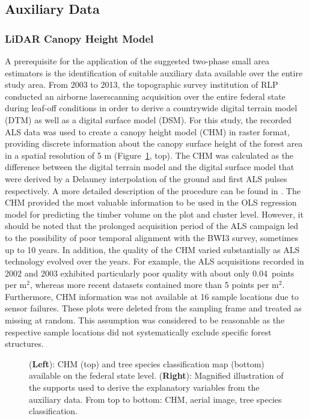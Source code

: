\documentclass[remotesensing,article,accept,moreauthors,pdftex,10pt,a4paper]{Definitions/mdpi}
\begin{document}
\subsection{Auxiliary Data}
\label{sec:auxinfo}
\vspace{-6pt}
\subsubsection{LiDAR Canopy Height Model}
\label{sec:chm}

A prerequisite for the application of the suggested two-phase small area estimators is the identification of suitable auxiliary data available over the entire study area. From 2003 to 2013, the topographic survey institution of RLP conducted an airborne laserscanning acquisition over the entire federal state during leaf-off conditions in order to derive a countrywide digital terrain model (DTM) as well as a digital surface model (DSM). For this study, the recorded ALS data was used to create a canopy height model (CHM) in raster format, providing discrete information about the canopy surface height of the forest area in a spatial resolution of 5 m (Figure~\ref{fig:Auxvars}, {top}). The CHM was calculated as the difference between the digital terrain model and the digital surface model that were derived by a Delauney interpolation of the ground and first ALS pulses respectively. A more detailed description of the procedure can be found in \citet{hill2017a}. The CHM provided the most valuable information to be used in the OLS regression model for predicting the timber volume on the plot and cluster level. However, it should be noted that the prolonged acquisition period of the ALS campaign led to the possibility of poor temporal alignment with the BWI3 survey, sometimes up to 10 years. In addition, the quality of the CHM varied substantially as ALS technology evolved over the years.  For example, the ALS acquisitions recorded in 2002 and 2003 exhibited particularly poor quality with about only 0.04~points per m$^2$, whereas more recent datasets contained more than 5 points per m$^2$. Furthermore, CHM information was not available at 16 sample locations due to sensor failures. These plots were deleted from the sampling frame and treated as missing at random. This assumption was considered to be reasonable as the respective sample locations did not systematically exclude specific forest structures.

\begin{figure}[H]
	\centering
	\caption{(\textbf{Left}): CHM (top) and tree species classification map (bottom) available on the federal state level. (\textbf{Right}): Magnified illustration of the supports used to derive the explanatory variables from the auxiliary data. From top to bottom: CHM, aerial image, tree species classification.}
	\label{fig:Auxvars}
\end{figure}
\end{document}
